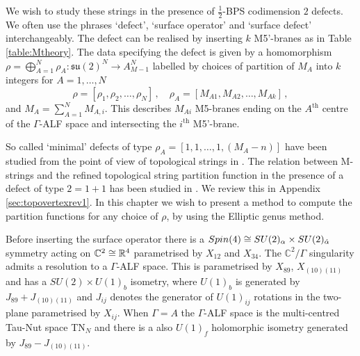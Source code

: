 \documentclass[main.tex]{subfiles}
\begin{document}
We wish to study these strings in the presence of $\frac{1}{2}$-BPS codimension $2$ defects. We often use the phrases `defect', `surface operator' and `surface defect' interchangeably. The defect can be realised by inserting $k$ M5'-branes as in Table \ref{table:Mtheory}.  
The data specifying the defect is given by a homomorphism $\rho=\bigoplus_{A=1}^N\rho_A:\mathfrak{su}(2)^{N}\to A^N_{M-1}$ labelled by choices of partition of $M_A$ into $k$ integers for $A=1,\dots,N$
\begin{equation}\label{eqn:partitionM}
\rho=[\rho_1,\rho_2,\dots,\rho_{N}]\,,\quad \rho_A=[M_{A1},M_{A2},\dots,M_{Ak}]\,,
\end{equation}
and $M_A=\sum_{A=1}^NM_{A,i}$. This describes $M_{Ai}$ M5-branes ending on the $A^{\text{th}}$ centre of the $\Gamma$-ALF space and intersecting the $i^{\text{th}}$ M5'-brane.

So called `minimal' defects of type $\rho_A=[1,1,\dots,1,(M_A-n)]$ have been studied from the point of view of topological strings in \cite{Mori:2016qof,Iqbal:2012xm,Vafa:2012fi,Taki:2010bj}. The relation between M-strings and the refined topological string partition function in the presence of a defect of type $2=1+1$ has been studied in \cite{Mori:2016qof}. We review this in Appendix \ref{sec:topovertexrev1}. In this chapter we wish to present a method to compute the partition functions for any choice of $\rho$, by using the Elliptic genus method.

Before inserting the surface operator there is a $Spin(4)\cong SU(2)_{\alpha}\times SU(2)_{\dot\alpha}$ symmetry acting on $\mathbb{C}^2\cong \mathbb{R}^4$ parametrised by $X_{12}$ and $X_{34}$. The $\mathbb{C}^2/\Gamma$ singularity admits a resolution to a $\Gamma$-ALF space. This is parametrised by $X_{89}$, $X_{(10)(11)}$ and has a $SU(2)\times U(1)_b$ isometry, where $U(1)_b$ is generated by $J_{89}+J_{(10)(11)}$ and $J_{ij}$ denotes the generator of $U(1)_{ij}$ rotations in the two-plane parametrised by $X_{ij}$. When $\Gamma=A$ the $\Gamma$-ALF space is the multi-centred Tau-Nut space TN$_N$ and there is a also $U(1)_f$ holomorphic isometry generated by $J_{89}-J_{(10)(11)}$.
\end{document}
